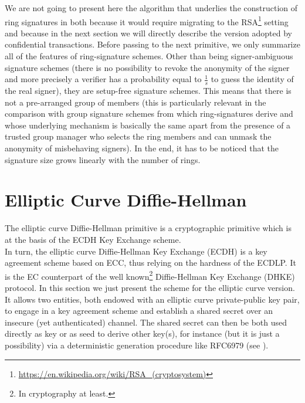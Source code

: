 We are not going to present here the algorithm that underlies the construction of ring signatures in \cite{LeakSecret} both because it would require migrating to the RSA\footnote{\url{https://en.wikipedia.org/wiki/RSA_(cryptosystem)}} setting and because in the next section we will directly describe the version adopted by confidential transactions. Before passing to the next primitive, we only summarize all of the features of ring-signature schemes. Other than being signer-ambiguous signature schemes (there is no possibility to revoke the anonymity of the signer and more precisely a verifier has a probability equal to $\frac{1}{s}$ to guess the identity of the real signer), they are setup-free signature schemes. This means that there is not a pre-arranged group of members (this is particularly relevant in the comparison with group signature schemes from which ring-signatures derive and whose underlying mechanism is basically the same apart from the presence of a trusted group manager who selects the ring members and can unmask the anonymity of misbehaving signers). In the end, it has to be noticed that the signature size grows linearly with the number of rings.

\section{Elliptic Curve Diffie-Hellman}
\label{ECDH}
The elliptic curve Diffie-Hellman primitive is a cryptographic primitive which is at the basis of the ECDH Key Exchange scheme.\\
In turn, the elliptic curve Diffie-Hellman Key Exchange (ECDH) is a key agreement scheme based on ECC, thus relying on the hardness of the ECDLP. It is the EC counterpart of the well known\footnote{In cryptography at least.} Diffie-Hellman Key Exchange (DHKE) protocol. In this section we just present the scheme for the elliptic curve version.\\
It allows two entities, both endowed with an elliptic curve private-public key pair, to engage in a key agreement scheme and establish a shared secret over an insecure (yet authenticated) channel. The shared secret can then be both used directly as key or as seed to derive other key(s), for instance (but it is just a possibility) via a deterministic generation procedure like RFC6979 (see \cite{rfc6979}).
